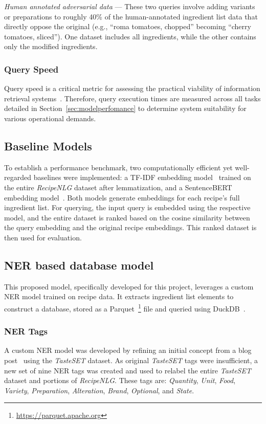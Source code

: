 \documentclass[11pt]{article}
\begin{document}
\emph{Human annotated adversarial data} --- These two queries involve adding
variants or preparations to roughly 40\% of the human-annotated ingredient list
data that directly oppose the original (e.g., ``roma tomatoes, chopped''
becoming ``cherry tomatoes, sliced'').
One dataset includes all ingredients, while the other contains only the modified
ingredients.

\subsubsection{Query Speed}
Query speed is a critical metric for assessing the practical viability of
information retrieval systems~\cite{manning2009introduction}.
Therefore, query execution times are measured across all tasks detailed in
Section~\ref{sec:modelperfomance} to determine system suitability for various
operational demands.

\subsection{Baseline Models}
To establish a performance benchmark, two computationally efficient yet
well-regarded baselines were implemented: a TF-IDF embedding model~\cite{tfidf}
trained on the entire \emph{RecipeNLG} dataset after lemmatization, and a
SentenceBERT embedding model~\cite{sentence-bert}.
Both models generate embeddings for each recipe's full ingredient list.
For querying, the input query is embedded using the respective model, and the
entire dataset is ranked based on the cosine similarity between the query
embedding and the original recipe embeddings.
This ranked dataset is then used for evaluation.

\subsection{NER based database model}
This proposed model, specifically developed for this project, leverages a custom
NER model trained on recipe data.
It extracts ingredient list elements to construct a database, stored as a
Parquet~\footnote{\url{https://parquet.apache.org}} file and queried using
DuckDB~\cite{duckdb}.

\subsubsection{NER Tags}\label{sec:ner_tags}
A custom NER model was developed by refining an initial concept from a blog
post~\cite{ingNerwb} using the \emph{TasteSET} dataset.
As original \emph{TasteSET} tags were insufficient, a new set of nine NER tags
was created and used to relabel the entire \emph{TasteSET} dataset and portions
of \emph{RecipeNLG}.
These tags are: \emph{Quantity}, \emph{Unit}, \emph{Food}, \emph{Variety},
\emph{Preparation}, \emph{Alteration}, \emph{Brand}, \emph{Optional}, and
\emph{State}.
\end{document}
